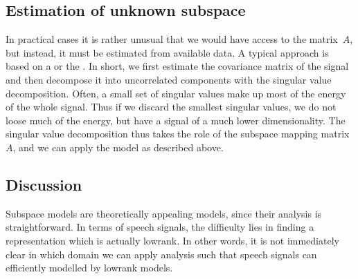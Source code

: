 \documentclass[letterpaper,10pt,english]{jupyterBook}
\begin{document}
\subsection{Estimation of unknown sub\sphinxhyphen{}space}
\label{\detokenize{Modelling/Sub-space_models:estimation-of-unknown-sub-space}}
\sphinxAtStartPar
In practical cases it is rather unusual that we would have access to the
matrix \(A\), but instead, it must be estimated from available data. A
typical approach is based on a  or
the .
In short, we first estimate the covariance matrix of the signal and then
decompose it into uncorrelated components with the singular value
decomposition. Often, a small set of singular values make up most of the
energy of the whole signal. Thus if we discard the smallest singular
values, we do not loose much of the energy, but have a signal of a much
lower dimensionality. The singular value decomposition thus takes the
role of the sub\sphinxhyphen{}space mapping matrix \(A\), and we can apply the model as
described above.


\subsection{Discussion}
\label{\detokenize{Modelling/Sub-space_models:discussion}}
\sphinxAtStartPar
Sub\sphinxhyphen{}space models are theoretically appealing models, since their
analysis is straightforward. In terms of speech signals, the difficulty
lies in finding a representation which is actually low\sphinxhyphen{}rank. In other
words, it is not immediately clear in which domain we can apply analysis
such that speech signals can efficiently modelled by low\sphinxhyphen{}rank models.

\sphinxstepscope
\end{document}

